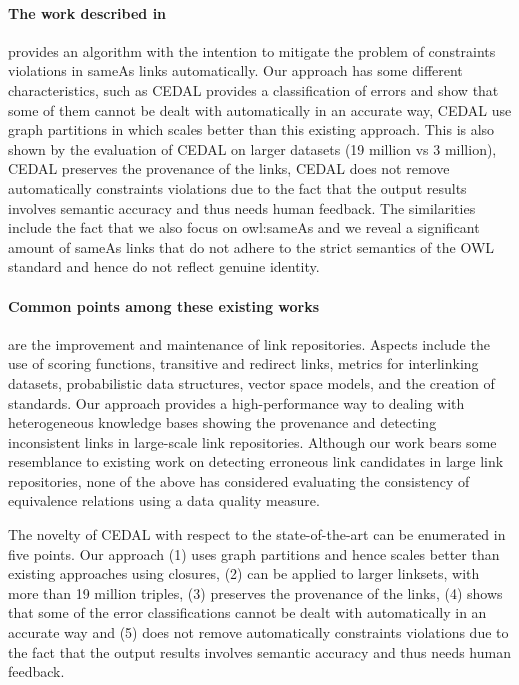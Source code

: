 \paragraph{The work described in~\cite{Melo2013NotQT}} provides an algorithm with the intention to mitigate the problem of constraints violations in sameAs links automatically. Our approach has some different characteristics, such as CEDAL provides a classification of errors and show that some of them cannot be dealt with automatically in an accurate way, CEDAL use graph partitions in which scales better than this existing approach. This is also shown by the evaluation of CEDAL on larger datasets (19 million vs 3 million), CEDAL preserves the provenance of the links,  CEDAL does not remove automatically constraints violations due to the fact that the output results involves semantic accuracy and thus needs human feedback. The similarities include the fact that we also focus on owl:sameAs and we reveal a significant amount of sameAs links that do not adhere to the strict semantics of the OWL standard and hence do not reflect genuine identity.

\paragraph{Common points among these existing works} are the improvement and maintenance of link repositories. Aspects include the use of scoring functions, transitive and redirect links, metrics for interlinking datasets, probabilistic data structures, vector space models, and the creation of standards. Our approach provides a high-performance way to dealing with heterogeneous knowledge bases showing the provenance and detecting inconsistent links in large-scale link repositories. 
Although our work bears some resemblance to existing work on detecting erroneous link candidates in large link repositories, none of the above has considered evaluating the consistency of equivalence relations using a data quality measure. %

The novelty of CEDAL with respect to the state-of-the-art can be enumerated in five points. Our approach (1) uses graph partitions and hence scales better than existing approaches using closures, (2) can be applied to larger linksets, with more than 19 million triples, (3) preserves the provenance of the links, (4) shows that some of the error classifications cannot be dealt with automatically in an accurate way and (5) does not remove automatically constraints violations due to the fact that the output results involves semantic accuracy and thus needs human feedback.


